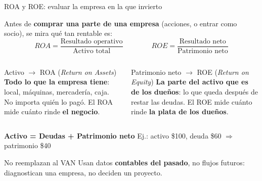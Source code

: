 \documentclass[aspectratio=169,10pt]{beamer}
\begin{document}
\begin{frame}{ROA y ROE: evaluar la empresa en la que invierto}

Antes de \textbf{comprar una parte de una empresa} (acciones, o entrar como socio), se mira qué tan rentable es:
\[
ROA = \frac{\text{Resultado operativo}}{\text{Activo total}}
\qquad\qquad
ROE = \frac{\text{Resultado neto}}{\text{Patrimonio neto}}
\]

\begin{columns}[T]
\begin{block}{Activo $\to$ ROA (\emph{Return on Assets})}
\textbf{Todo lo que la empresa tiene}: local, máquinas, mercadería, caja. No importa quién lo
pagó. El ROA mide cuánto rinde \textbf{el negocio}.
\end{block}

\begin{block}{Patrimonio neto $\to$ ROE (\emph{Return on Equity})}
\textbf{La parte del activo que es de los dueños}: lo que queda después de restar las deudas.
El ROE mide cuánto rinde \textbf{la plata de los dueños}.
\end{block}
\end{columns}

\begin{center}
\textbf{Activo = Deudas + Patrimonio neto} \qquad Ej.: activo \$100, deuda \$60 $\Rightarrow$ patrimonio \$40
\end{center}

\begin{alertblock}{No reemplazan al VAN}
Usan datos \textbf{contables del pasado}, no flujos futuros: diagnostican una empresa, no deciden un proyecto.
\end{alertblock}
\end{frame}
\end{document}
